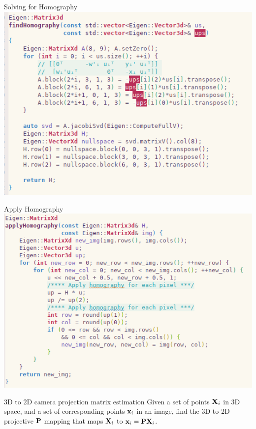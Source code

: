 \documentclass[times,t]{beamer}
\begin{document}
\begin{frame}{Solving for Homography }
  \includegraphics[width=\linewidth]{media/homography-code.png}
\end{frame}
\begin{frame}
  Apply Homography
  \includegraphics[width=\linewidth]{media/apply-homography-code.png}
\end{frame}

\begin{frame}{3D  to  2D camera projection matrix estimation}
  Given a set of points $\mathbf{X}_i$ in 3D space, and a set
  of corresponding points $\mathbf{x}_i$ in an image, find the 3D to 2D projective
  $\mathbf{P}$ mapping
  that maps $\mathbf{X}_i$ to $\mathbf{x}_i  =  \mathbf{P}\mathbf{X}_i$.
\end{frame}
\end{document}
